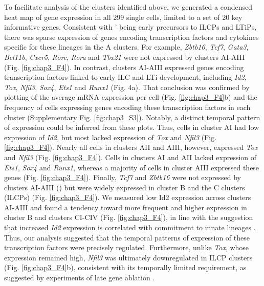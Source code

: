 To facilitate analysis of the clusters identified above, we generated a condensed heat map of gene expression in all 299 single cells, limited to a set of 20 key informative genes. Consistent with \aLPs' being early precursors to ILCPs and LTiPs, there was sparse expression of genes encoding transcription factors and cytokines specific for these lineages in the A clusters. For example, \textit{Zbtb16}, \textit{Tcf7}, \textit{Gata3}, \textit{Bcl11b}, \textit{Cxcr5}, \textit{Rorc}, \textit{Rora} and \textit{Tbx21} were not expressed by clusters AI-AIII (Fig. \ref{fig:chap3_F4}). In contrast, clusters AI-AIII expressed genes encoding transcription factors linked to early ILC and LTi development, including \textit{Id2}, \textit{Tox}, \textit{Nfil3}, \textit{Sox4}, \textit{Ets1} and \textit{Runx1} (Fig. 4a). That conclusion was confirmed by plotting of the average mRNA expression per cell (Fig. \ref{fig:chap3_F4}b) and the frequency of cells expressing genes encoding these transcription factors in each cluster (Supplementary Fig. \ref{fig:chap3_S3}). Notably, a distinct temporal pattern of expression could be inferred from these plots. Thus, cells in cluster AI had low expression of \textit{Id2}, but most lacked expression of \textit{Tox} and \textit{Nfil3} (Fig. \ref{fig:chap3_F4}). Nearly all cells in clusters AII and AIII, however, expressed \textit{Tox} and \textit{Nfil3} (Fig. \ref{fig:chap3_F4}). Cells in clusters AI and AII lacked expression of \textit{Ets1}, \textit{Sox4} and \textit{Runx1}, whereas a majority of cells in cluster AIII expressed these genes (Fig. \ref{fig:chap3_F4}). Finally, \textit{Tcf7} and \textit{Zbtb16} were not expressed by clusters AI-AIII (\aLPs) but were widely expressed in cluster B and the C clusters (ILCPs) (Fig. \ref{fig:chap3_F4}). We measured low Id2 expression across clusters AI-AIII and found a tendency toward more frequent and higher expression in cluster B and clusters CI-CIV (Fig. \ref{fig:chap3_F4}), in line with the suggestion that increased \textit{Id2} expression is correlated with commitment to innate lineages \cite{klose2014}. Thus, our analysis suggested that the temporal patterns of expression of these transcription factors were precisely regulated. Furthermore, unlike \textit{Tox}, whose expression remained high, \textit{Nfil3} was ultimately downregulated in ILCP clusters (Fig. \ref{fig:chap3_F4}b), consistent with its temporally limited requirement, as suggested by experiments of late gene ablation \cite{xu2015}.

